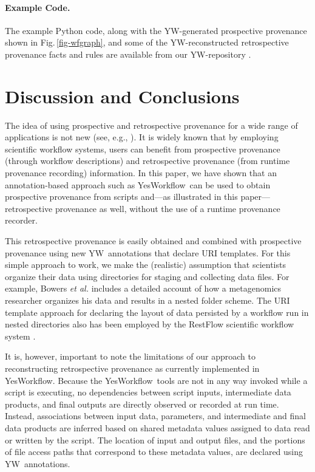 \documentclass[nocopyrightspace]{sigplanconf}
\newcommand{\figref}[1]{Fig.\,\ref{#1}}
\newcommand{\YW}{\textsf{YesWorkflow}}
\newcommand{\yw}{\textsf{YW}}
\begin{document}
\paragraph{Example Code.}
The example Python code, along with the \yw-generated prospective
provenance shown in \figref{fig-wfgraph}, and some of the
\yw-reconstructed retrospective provenance facts and rules are
available from our \yw-repository \cite{mcphillips2015example}.




\section{Discussion and Conclusions} 
\label{sec:discussion}

The idea of using prospective and retrospective provenance for a wide
range of applications is not new (see, e.g.,
\cite{zhao2006applying,missier2008data,frew2008automatic}).  It is
widely known that by employing scientific workflow systems, users can
benefit from prospective provenance (through workflow descriptions)
and retrospective provenance (from runtime provenance recording)
information. In this paper, we have shown that 
an annotation-based approach such as \YW\ can be used to obtain
prospective provenance from scripts and---as illustrated in this
paper---retrospective provenance as well, without the use of a runtime
provenance recorder.  

This retrospective provenance is easily obtained and combined with prospective
provenance using new \yw\ annotations that declare URI templates. For this
simple approach to work, we make the (realistic) assumption that
scientists organize their data using directories for staging and
collecting data files. For example, Bowers \emph{et al.}
\cite{bowers2007project} includes a detailed account of how a
metagenomics researcher organizes his data and results in a nested
folder scheme. The URI template approach for declaring the
layout of data persisted by a workflow run in nested directories 
also has been employed by the RestFlow scientific workflow system
\cite{tsai2013autodrug}.

It is, however, important to note the limitations of our approach to
reconstructing retrospective provenance as currently implemented in
\YW.  Because the \YW\ tools are not in any way invoked while a script
is executing, no dependencies between script inputs, intermediate data
products, and final outputs are directly observed or recorded at run
time. Instead, associations between input data, parameters, and
intermediate and final data products are inferred based on shared
metadata values assigned to data read or written by the script.  The
location of input and output files, and the portions of file access
paths that correspond to these metadata values, are declared using
\yw\ annotations.
\end{document}
